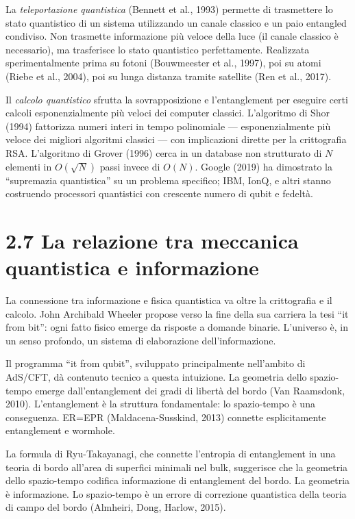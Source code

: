 \documentclass[11.5pt,a4paper,openany]{book}
\theoremstyle{remark}
\begin{document}
La \textit{teleportazione quantistica} (Bennett et al., 1993) permette di trasmettere lo stato quantistico di un sistema utilizzando un canale classico e un paio entangled condiviso. Non trasmette informazione più veloce della luce (il canale classico è necessario), ma trasferisce lo stato quantistico perfettamente. Realizzata sperimentalmente prima su fotoni (Bouwmeester et al., 1997), poi su atomi (Riebe et al., 2004), poi su lunga distanza tramite satellite (Ren et al., 2017).

Il \textit{calcolo quantistico} sfrutta la sovrapposizione e l'entanglement per eseguire certi calcoli esponenzialmente più veloci dei computer classici. L'algoritmo di Shor (1994) fattorizza numeri interi in tempo polinomiale --- esponenzialmente più veloce dei migliori algoritmi classici --- con implicazioni dirette per la crittografia RSA. L'algoritmo di Grover (1996) cerca in un database non strutturato di $N$ elementi in $O(\sqrt{N})$ passi invece di $O(N)$. Google (2019) ha dimostrato la ``supremazia quantistica'' su un problema specifico; IBM, IonQ, e altri stanno costruendo processori quantistici con crescente numero di qubit e fedeltà.

\section{2.7 La relazione tra meccanica quantistica e informazione}

La connessione tra informazione e fisica quantistica va oltre la crittografia e il calcolo. John Archibald Wheeler propose verso la fine della sua carriera la tesi ``it from bit'': ogni fatto fisico emerge da risposte a domande binarie. L'universo è, in un senso profondo, un sistema di elaborazione dell'informazione.

Il programma ``it from qubit'', sviluppato principalmente nell'ambito di AdS/CFT, dà contenuto tecnico a questa intuizione. La geometria dello spazio-tempo emerge dall'entanglement dei gradi di libertà del bordo (Van Raamsdonk, 2010). L'entanglement è la struttura fondamentale: lo spazio-tempo è una conseguenza. ER=EPR (Maldacena-Susskind, 2013) connette esplicitamente entanglement e wormhole.

La formula di Ryu-Takayanagi, che connette l'entropia di entanglement in una teoria di bordo all'area di superfici minimali nel bulk, suggerisce che la geometria dello spazio-tempo codifica informazione di entanglement del bordo. La geometria è informazione. Lo spazio-tempo è un errore di correzione quantistica della teoria di campo del bordo (Almheiri, Dong, Harlow, 2015).
\end{document}
